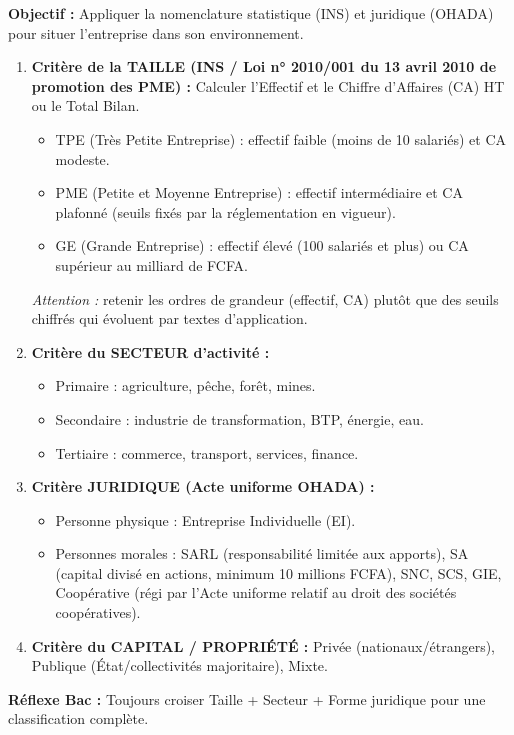 \documentclass[11pt]{article}
\newcommand{\cle}[1]{{\popxbold\color{popdark}#1}}
\begin{document}
\begin{methode}
    \textbf{Objectif :} Appliquer la nomenclature statistique (INS) et juridique (OHADA) pour situer l'entreprise dans son environnement.
    \begin{enumerate}
        \item \textbf{Critère de la TAILLE (INS / Loi n° 2010/001 du 13 avril 2010 de promotion des PME) :} Calculer l'\cle{Effectif} et le \cle{Chiffre d'Affaires (CA) HT} ou le \cle{Total Bilan}.
              \begin{itemize}
                  \item \cle{TPE (Très Petite Entreprise)} : effectif faible (moins de 10 salariés) et CA modeste.
                  \item \cle{PME (Petite et Moyenne Entreprise)} : effectif intermédiaire et CA plafonné (seuils fixés par la réglementation en vigueur).
                  \item \cle{GE (Grande Entreprise)} : effectif élevé (100 salariés et plus) ou CA supérieur au milliard de FCFA.
              \end{itemize}
              \emph{Attention :} retenir les ordres de grandeur (effectif, CA) plutôt que des seuils chiffrés qui évoluent par textes d'application.
        \item \textbf{Critère du SECTEUR d'activité :}
              \begin{itemize}
                  \item \cle{Primaire} : agriculture, pêche, forêt, mines.
                  \item \cle{Secondaire} : industrie de transformation, BTP, énergie, eau.
                  \item \cle{Tertiaire} : commerce, transport, services, finance.
              \end{itemize}
        \item \textbf{Critère JURIDIQUE (Acte uniforme OHADA) :}
              \begin{itemize}
                  \item \cle{Personne physique} : Entreprise Individuelle (EI).
                  \item \cle{Personnes morales} : SARL (responsabilité limitée aux apports), SA (capital divisé en actions, minimum 10 millions FCFA), SNC, SCS, GIE, Coopérative (régi par l'Acte uniforme relatif au droit des sociétés coopératives).
              \end{itemize}
        \item \textbf{Critère du CAPITAL / PROPRIÉTÉ :} Privée (nationaux/étrangers), Publique (État/collectivités majoritaire), Mixte.
    \end{enumerate}
    \textbf{Réflexe Bac :} Toujours croiser Taille + Secteur + Forme juridique pour une classification complète.
\end{methode}
\end{document}
